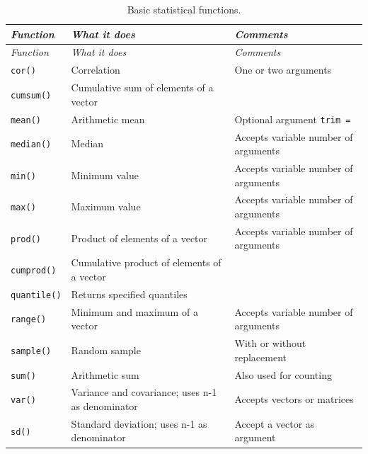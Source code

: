 \documentclass[
]{book}
\begin{document}
\begin{longtable}[]{@{}
  >{\raggedright\arraybackslash}p{}
  >{\raggedright\arraybackslash}p{}
  >{\raggedright\arraybackslash}p{}@{}}
\caption{\label{tab:StatFunc} Basic statistical functions.}\tabularnewline
\toprule\noalign{}
\begin{minipage}[b]{\linewidth}\raggedright
\emph{{Function}}
\end{minipage} & \begin{minipage}[b]{\linewidth}\raggedright
\emph{{What it does}}
\end{minipage} & \begin{minipage}[b]{\linewidth}\raggedright
\emph{{Comments}}
\end{minipage} \\
\midrule\noalign{}
\endfirsthead
\toprule\noalign{}
\begin{minipage}[b]{\linewidth}\raggedright
\emph{{Function}}
\end{minipage} & \begin{minipage}[b]{\linewidth}\raggedright
\emph{{What it does}}
\end{minipage} & \begin{minipage}[b]{\linewidth}\raggedright
\emph{{Comments}}
\end{minipage} \\
\midrule\noalign{}
\endhead
\bottomrule\noalign{}
\endlastfoot
\texttt{cor()} & Correlation & One or two arguments \\
\texttt{cumsum()} & Cumulative sum of elements of a vector & \\
\texttt{mean()} & Arithmetic mean & Optional argument \texttt{trim\ =} \\
\texttt{median()} & Median & Accepts variable number of arguments \\
\texttt{min()} & Minimum value & Accepts variable number of arguments \\
\texttt{max()} & Maximum value & Accepts variable number of arguments \\
\texttt{prod()} & Product of elements of a vector & Accepts variable number of arguments \\
\texttt{cumprod()} & Cumulative product of elements of a vector & \\
\texttt{quantile()} & Returns specified quantiles & \\
\texttt{range()} & Minimum and maximum of a vector & Accepts variable number of arguments \\
\texttt{sample()} & Random sample & With or without replacement \\
\texttt{sum()} & Arithmetic sum & Also used for counting \\
\texttt{var()} & Variance and covariance; uses n-1 as denominator & Accepts vectors or matrices \\
\texttt{sd()} & Standard deviation; uses n-1 as denominator & Accept a vector as argument \\
\end{longtable}
\end{document}
